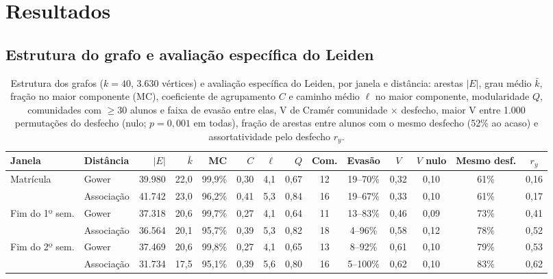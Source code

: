 \section{Resultados}
\label{resultados}

\subsection{Estrutura do grafo e avaliação específica do Leiden}

\begin{table}[!t]
\centering
\caption{Estrutura dos grafos ($k = 40$, 3.630 vértices) e avaliação específica do Leiden, por janela e distância: arestas $|E|$, grau médio $\bar{k}$, fração no maior componente (MC), coeficiente de agrupamento $C$ e caminho médio $\ell$ no maior componente, modularidade $Q$, comunidades com $\geq 30$ alunos e faixa de evasão entre elas, V de Cramér comunidade $\times$ desfecho, maior V entre 1.000 permutações do desfecho (nulo; $p = 0{,}001$ em todas), fração de arestas entre alunos com o mesmo desfecho (52\% ao acaso) e assortatividade pelo desfecho $r_y$.}
\label{tab-grafo}
\small
\setlength{\tabcolsep}{4.2pt}
\begin{tabular}{@{}llrrrrrrcccccc@{}}
\toprule
\textbf{Janela} & \textbf{Distância} & $|E|$ & $\bar{k}$ & MC & $C$ & $\ell$ & $Q$ & \textbf{Com.} & \textbf{Evasão} & $V$ & $V$ \textbf{nulo} & \textbf{Mesmo desf.} & $r_y$ \\
\midrule
Matrícula    & Gower      & 39.980 & 22,0 & 99,9\% & 0,30 & 4,1 & 0,67 & 12 & 19--70\% & 0,32 & 0,10 & 61\% & 0,16 \\
             & Associação & 41.742 & 23,0 & 96,2\% & 0,41 & 5,3 & 0,84 & 16 & 19--67\% & 0,33 & 0,10 & 61\% & 0,17 \\
Fim do 1º sem. & Gower    & 37.318 & 20,6 & 99,7\% & 0,27 & 4,1 & 0,64 & 11 & 13--83\% & 0,46 & 0,09 & 73\% & 0,41 \\
             & Associação & 36.564 & 20,1 & 95,7\% & 0,39 & 5,3 & 0,82 & 18 & 4--96\%  & 0,58 & 0,12 & 78\% & 0,52 \\
Fim do 2º sem. & Gower    & 37.469 & 20,6 & 99,8\% & 0,27 & 4,1 & 0,65 & 13 & 8--92\%  & 0,61 & 0,10 & 79\% & 0,53 \\
             & Associação & 31.734 & 17,5 & 95,1\% & 0,39 & 5,6 & 0,80 & 16 & 5--100\% & 0,62 & 0,10 & 83\% & 0,62 \\
\bottomrule
\end{tabular}
\end{table}

